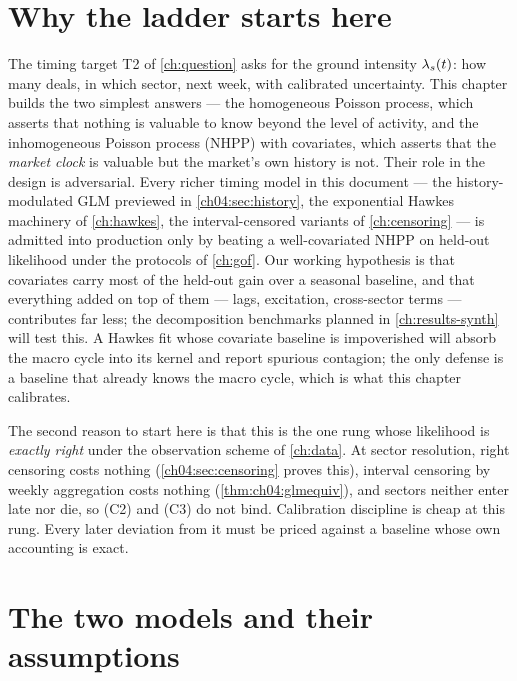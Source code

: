 
\section{Why the ladder starts here}\label{ch04:sec:role}

The timing target T2 of \cref{ch:question} asks for the ground intensity
$\lambda_s(t)$: how many deals, in which sector, next week, with calibrated
uncertainty. This chapter builds the two simplest answers --- the
homogeneous Poisson process, which asserts that nothing is valuable to know
beyond the level of activity, and the inhomogeneous Poisson process (NHPP)
with covariates, which asserts that the \emph{market clock} is valuable but
the market's own history is not. Their role in the design is adversarial.
Every richer timing model in this document --- the
history-modulated GLM previewed in \cref{ch04:sec:history}, the exponential
Hawkes machinery of \cref{ch:hawkes}, the interval-censored variants of
\cref{ch:censoring} --- is admitted into production only by beating a
well-covariated NHPP on held-out likelihood under the protocols of
\cref{ch:gof}. Our working hypothesis is that covariates carry most of the
held-out gain over a seasonal baseline, and that everything added on top
of them --- lags, excitation, cross-sector terms --- contributes far less;
the decomposition benchmarks planned in \cref{ch:results-synth} will test
this. A Hawkes fit whose covariate baseline
is impoverished will absorb the macro cycle into its kernel and report
spurious contagion; the only defense is a baseline that already knows the
macro cycle, which is what this chapter calibrates.

The second reason to start here is that this is the one rung whose
likelihood is \emph{exactly right} under the observation scheme of
\cref{ch:data}. At sector resolution, right censoring costs nothing
(\cref{ch04:sec:censoring} proves this), interval censoring by weekly
aggregation costs nothing (\cref{thm:ch04:glmequiv}), and sectors neither
enter late nor die, so (C2) and (C3) do not bind. Calibration discipline is
cheap at this rung. Every later deviation from it must be priced against a
baseline whose own accounting is exact.

\section{The two models and their assumptions}\label{ch04:sec:models}

